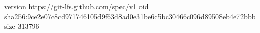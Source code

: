 version https://git-lfs.github.com/spec/v1
oid sha256:9ce2e07c8cd971746105d9f63d8ad0e31be6c5bc30466c096d89508eb4e72bbb
size 313796
